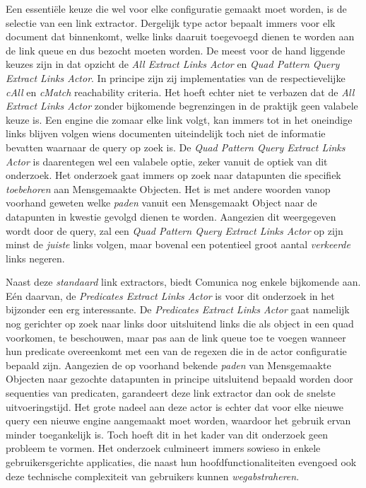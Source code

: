 \documentclass[conference]{IEEEtran}
\begin{document}
Een essentiële keuze die wel voor elke configuratie gemaakt moet worden, is de selectie van een link extractor. Dergelijk type actor bepaalt immers voor elk document dat binnenkomt, welke links daaruit toegevoegd dienen te worden aan de link queue en dus bezocht moeten worden. De meest voor de hand liggende keuzes zijn in dat opzicht de \textit{All Extract Links Actor} en \textit{Quad Pattern Query Extract Links Actor}. In principe zijn zij implementaties van de respectievelijke \textit{cAll} en \textit{cMatch} reachability criteria. Het hoeft echter niet te verbazen dat de \textit{All Extract Links Actor} zonder bijkomende begrenzingen in de praktijk geen valabele keuze is. Een engine die zomaar elke link volgt, kan immers tot in het oneindige links blijven volgen wiens documenten uiteindelijk toch niet de informatie bevatten waarnaar de query op zoek is. De \textit{Quad Pattern Query Extract Links Actor} is daarentegen wel een valabele optie, zeker vanuit de optiek van dit onderzoek. Het onderzoek gaat immers op zoek naar datapunten die specifiek \textit{toebehoren} aan Mensgemaakte Objecten. Het is met andere woorden vanop voorhand geweten welke \textit{paden} vanuit een Mensgemaakt Object naar de datapunten in kwestie gevolgd dienen te worden. Aangezien dit weergegeven wordt door de query, zal een \textit{Quad Pattern Query Extract Links Actor} op zijn minst de \textit{juiste} links volgen, maar bovenal een potentieel groot aantal \textit{verkeerde} links negeren.

Naast deze \textit{standaard} link extractors, biedt Comunica nog enkele bijkomende aan. Eén daarvan, de \textit{Predicates Extract Links Actor} is voor dit onderzoek in het bijzonder een erg interessante. De \textit{Predicates Extract Links Actor} gaat namelijk nog gerichter op zoek naar links door uitsluitend links die als object in een quad voorkomen, te beschouwen, maar pas aan de link queue toe te voegen wanneer hun predicate overeenkomt met een van de regexen die in de actor configuratie bepaald zijn. Aangezien de op voorhand bekende \textit{paden} van Mensgemaakte Objecten naar gezochte datapunten in principe uitsluitend bepaald worden door sequenties van predicaten, garandeert deze link extractor dan ook de snelste uitvoeringstijd. Het grote nadeel aan deze actor is echter dat voor elke nieuwe query een nieuwe engine aangemaakt moet worden, waardoor het gebruik ervan minder toegankelijk is. Toch hoeft dit in het kader van dit onderzoek geen probleem te vormen. Het onderzoek culmineert immers sowieso in enkele gebruikersgerichte applicaties, die naast hun hoofdfunctionaliteiten evengoed ook deze technische complexiteit van gebruikers kunnen \textit{wegabstraheren}.
\end{document}

